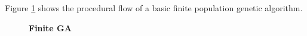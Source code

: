 Figure \ref{FiniteGA} shows the procedural flow of a basic finite population genetic algorithm.
\begin{figure}[H]
\begin{center}
\hspace{4pt}
\caption{\textbf{Finite GA} }
\label{FiniteGA}
\end{center}
\end{figure}

